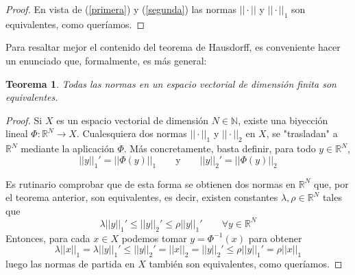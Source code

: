 \documentclass[a4paper, 12pt]{article}
\newtheorem{teorema}{Teorema}
\begin{document}
\begin{enumerate}[label=\textbf{\arabic*}.]
\begin{enumerate}[label=\textit{\alph*})]
\begin{proof}
			En vista de (\ref{primera}) y (\ref{segunda}) las normas \(||\cdot||\) y \(||\cdot||_1\) son equivalentes, como queríamos.
			\end{proof}
			
			
			Para resaltar mejor el contenido del teorema de Hausdorff, es conveniente hacer un enunciado que, formalmente, es más general:
			
			\begin{teorema}
			Todas las normas en un espacio vectorial de dimensión finita son equivalentes.
			\end{teorema}
			
			\begin{proof}
			Si \(X\) es un espacio vectorial de dimensión \(N \in \mathbb{N}\), existe una biyección lineal \(\Phi : \mathbb{R}^N \rightarrow X\). Cualesquiera dos normas \(||\cdot||_1\) y \(||\cdot||_2\) en \(X\), se "trasladan" a \(\mathbb{R}^N\) mediante la aplicación \(\Phi\). Más concretamente, basta definir, para todo \(y \in \mathbb{R}^N\),
			\[
			||y||_1' = ||\Phi (y)||_1 \qquad \text{y} \qquad ||y||_2' = ||\Phi (y)||_2
			\]
			
			Es rutinario comprobar que de esta forma se obtienen dos normas en \(\mathbb{R}^N\) que, por el teorema anterior, son equivalentes, es decir, existen constantes \(\lambda, \rho \in \mathbb{R}^N\) tales que
			\[
			\lambda ||y||_1' \leq ||y||_2' \leq \rho ||y||_1' \qquad \forall y \in \mathbb{R}^N
			\]
			Entonces, para cada \(x \in X\) podemos tomar \(y = \Phi^{-1} (x)\) para obtener
			\[
				\lambda ||x||_1 = \lambda ||y||_1' \leq ||y||_2' = ||x||_2 = ||y||_2' \leq \rho ||y||_1' = \rho ||x||_1
			\]
			luego las normas de partida en \(X\) también son equivalentes, como queríamos.
			\end{proof}
		\end{enumerate}
\end{enumerate}
\end{document}
